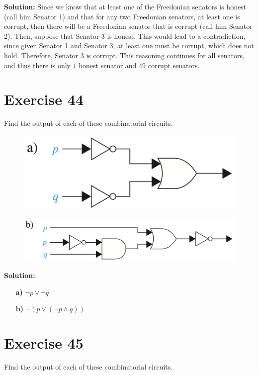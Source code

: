 \documentclass{Axon}
\begin{document}
\noindent
\textbf{Solution:}
Since we know that at least one of the Freedonian senators is honest (call him Senator 1) and that for any two Freedonian senators, at least one is corrupt, then there will be a Freedonian senator that is corrupt (call him Senator 2). Then, suppose that Senator 3 is honest. This would lead to a contradiction, since given Senator 1 and Senator 3, at least one must be corrupt, which does not hold. Therefore, Senator 3 is corrupt. This reasoning continues for all senators, and thus there is only \(1\) honest senator and \(49\) corrupt senators.

\section*{Exercise 44}
Find the output of each of these combinatorial circuits.

\begin{figure}[h]
\centering
\includegraphics[width=0.35\linewidth]{Discrete Mathematics and its Applications, 8th Edition/Chapter 1 Logic and Proofs/Section 1.2 Applications of Propositional Logic/Exercise 44-a.png}
\end{figure}

\begin{figure}[h]
\centering
\includegraphics[width=0.5\linewidth]{Discrete Mathematics and its Applications, 8th Edition/Chapter 1 Logic and Proofs/Section 1.2 Applications of Propositional Logic/Exercise 44-b.png}
\end{figure}

\noindent
\textbf{Solution:}
\begin{enumerate}
    \item[\textbf{a)}] \(\lnot p \lor \lnot q\)
    \item[\textbf{b)}] \(\lnot(p \lor (\lnot p \land q))\)
\end{enumerate}

\section*{Exercise 45}
Find the output of each of these combinatorial circuits.
\end{document}
